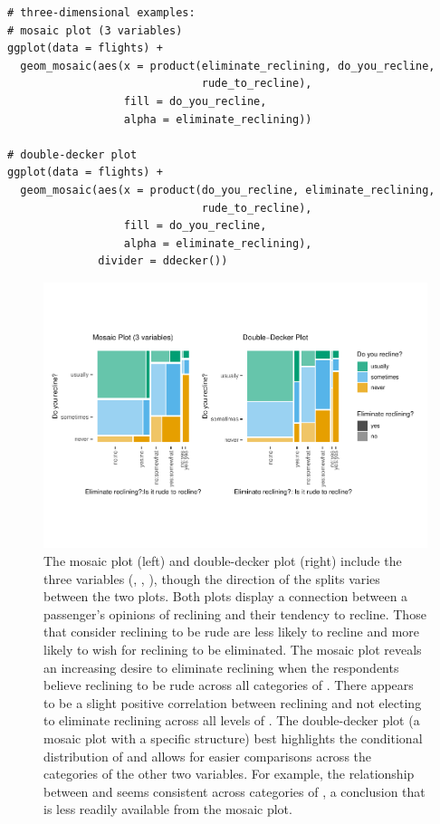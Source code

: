 \begin{verbatim}
# three-dimensional examples:
# mosaic plot (3 variables)
ggplot(data = flights) +
  geom_mosaic(aes(x = product(eliminate_reclining, do_you_recline,
                              rude_to_recline),
                  fill = do_you_recline, 
                  alpha = eliminate_reclining))

# double-decker plot
ggplot(data = flights) +
  geom_mosaic(aes(x = product(do_you_recline, eliminate_reclining,
                              rude_to_recline), 
                  fill = do_you_recline, 
                  alpha = eliminate_reclining),
              divider = ddecker())
\end{verbatim}

\begin{figure}[!h]

{\centering \includegraphics[width=1\linewidth]{RJ-2023-013_files/figure-latex/variety3-1} 

}

\caption{The mosaic plot (left) and double-decker plot (right) include the three variables (, , ), though the direction of the splits varies between the two plots. Both plots display a connection between a passenger's opinions of reclining and their tendency to recline. Those that consider reclining to be rude are less likely to recline and more likely to wish for reclining to be eliminated. The mosaic plot reveals an increasing desire to eliminate reclining when the respondents believe reclining to be rude across all categories of . There appears to be a slight positive correlation between reclining and not electing to eliminate reclining across all levels of . The double-decker plot (a mosaic plot with a specific structure) best highlights the conditional distribution of  and allows for easier comparisons across the categories of the other two variables. For example, the relationship between  and  seems consistent across categories of , a conclusion that is less readily available from the mosaic plot.}\label{fig:variety3}
\end{figure}

